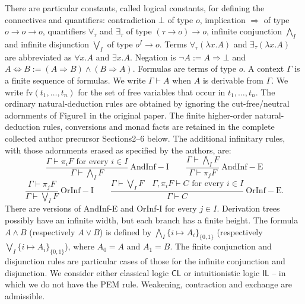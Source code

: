 \documentclass[10pt,a4paper]{article}
\newcommand{\IL}{\mathsf{IL}}
\newcommand{\CL}{\mathsf{CL}}
\begin{document}
There are particular constants, called logical constants, for defining the connectives and quantifiers: contradiction $\bot$ of type $o$, implication $\Rightarrow$ of type $o\to o\to o$, quantifiers $\forall_\tau$ and $\exists_\tau$ of type $(\tau\to o)\to o$, infinite conjunction $\bigwedge_I$ and infinite disjunction $\bigvee_I$ of type $o^I\to o$. Terms $\forall_\tau(\lambda x.A)$ and $\exists_\tau(\lambda x.A)$ are abbreviated as $\forall x.A$ and $\exists x.A$. Negation is $\neg A:=A\Rightarrow\bot$ and $A\Leftrightarrow B:=(A\Rightarrow B)\wedge(B\Rightarrow A)$. Formulas are terms of type $o$.
A context $\Gamma$ is a finite sequence of formulas. We write $\Gamma\vdash A$ when $A$ is derivable from $\Gamma$. We write $\mathrm{fv}(t_1,\ldots,t_n)$ for the set of free variables that occur in $t_1,\ldots,t_n$. The ordinary natural-deduction rules are obtained by ignoring the cut-free/neutral adornments of Figure1 in the original paper. The finite higher-order natural-deduction rules, conversions and monad facts are retained in the complete collected author precursor Sections2--6 below. The additional infinitary rules, with those adornments erased as specified by the authors, are:
\[\frac{\Gamma\vdash\pi_iF\text{ for every }i\in I}{\Gamma\vdash\bigwedge_I F}\ \mathrm{AndInf\!\!\!-I}\qquad\frac{\Gamma\vdash\bigwedge_I F}{\Gamma\vdash\pi_jF}\ \mathrm{AndInf\!\!\!-E}\]
\[\frac{\Gamma\vdash\pi_jF}{\Gamma\vdash\bigvee_I F}\ \mathrm{OrInf\!\!\!-I}\qquad\frac{\Gamma\vdash\bigvee_I F\quad\Gamma,\pi_iF\vdash C\text{ for every }i\in I}{\Gamma\vdash C}\ \mathrm{OrInf\!\!\!-E}.\]
There are versions of AndInf-E and OrInf-I for every $j\in I$. Derivation trees possibly have an infinite width, but each branch has a finite height. The formula $A\wedge B$ (respectively $A\vee B$) is defined by $\bigwedge_I\{i\mapsto A_i\}_{\{0,1\}}$ (respectively $\bigvee_I\{i\mapsto A_i\}_{\{0,1\}}$), where $A_0=A$ and $A_1=B$. The finite conjunction and disjunction rules are particular cases of those for the infinite conjunction and disjunction. We consider either classical logic $\CL$ or intuitionistic logic $\IL$ -- in which we do not have the PEM rule. Weakening, contraction and exchange are admissible.
\end{document}
